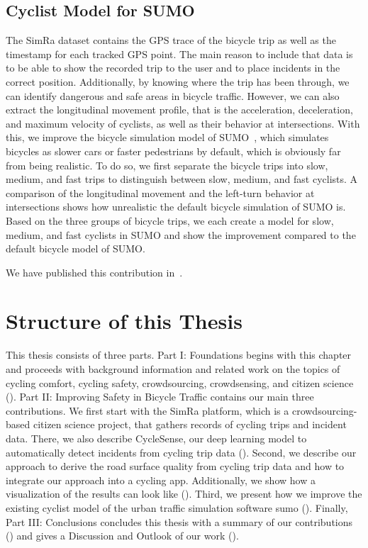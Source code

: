 \subsection{Cyclist Model for SUMO}
\label{subsec:sumo_contribution}
The SimRa dataset contains the GPS trace of the bicycle trip as well as the timestamp for each tracked GPS point.
The main reason to include that data is to be able to show the recorded trip to the user and to place incidents in the correct position.
Additionally, by knowing where the trip has been through, we can identify dangerous and safe areas in bicycle traffic.
However, we can also extract the longitudinal movement profile, that is the acceleration, deceleration, and maximum velocity of cyclists, as well as their behavior at intersections.
With this, we improve the bicycle simulation model of SUMO~\cite{lopez2018microscopic}, which simulates bicycles as slower cars or faster pedestrians by default, which is obviously far from being realistic.
To do so, we first separate the bicycle trips into slow, medium, and fast trips to distinguish between slow, medium, and fast cyclists.
A comparison of the longitudinal movement and the left-turn behavior at intersections shows how unrealistic the default bicycle simulation of SUMO is.
Based on the three groups of bicycle trips, we each create a model for slow, medium, and fast cyclists in SUMO and show the improvement compared to the default bicycle model of SUMO.

We have published this contribution in~\cite{karakaya2022realistic,karakaya2023achieving}.

\section{Structure of this Thesis}
\label{sec:structure}

This thesis consists of three parts.
Part I: Foundations begins with this chapter and proceeds with background information and related work on the topics of cycling comfort, cycling safety, crowdsourcing, crowdsensing, and citizen science ().
Part II: Improving Safety in Bicycle Traffic contains our main three contributions.
We first start with the SimRa platform, which is a crowdsourcing-based citizen science project, that gathers records of cycling trips and incident data.
There, we also describe CycleSense, our deep learning model to automatically detect incidents from cycling trip data ().
Second, we describe our approach to derive the road surface quality from cycling trip data and how to integrate our approach into a cycling app.
Additionally, we show how a visualization of the results can look like ().
Third, we present how we improve the existing cyclist model of the urban traffic simulation software \ac{sumo} ().
Finally, Part III: Conclusions concludes this thesis with a summary of our contributions () and gives a Discussion and Outlook of our work ().

